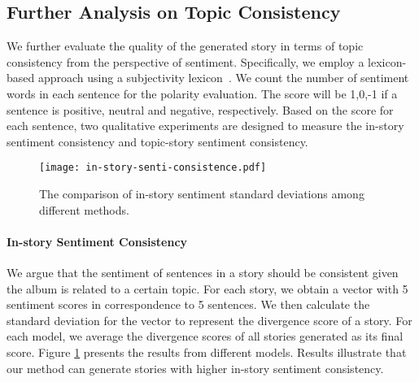 \documentclass[11pt]{article}
\newcommand{\citep}{\cite}
\begin{document}
\subsection{Further Analysis on Topic Consistency}
We further evaluate the quality of the generated story in terms of topic consistency from the perspective of sentiment. Specifically, we employ a lexicon-based approach using a subjectivity lexicon~\citep{wilson-etal-2005-recognizing}. We count the number of sentiment words in each sentence for the polarity evaluation. The score will be 1,0,-1 if a sentence is positive, neutral and negative, respectively. Based on the score for each sentence, two qualitative experiments are designed to measure the in-story sentiment consistency and topic-story sentiment consistency. 

\begin{figure}[t!]
\centering
  \texttt{[image: in-story-senti-consistence.pdf]}
  \vspace{-2mm}

  \caption{The comparison of in-story sentiment standard deviations among different methods.}
  \label{fig:in-story-sentiment}
\end{figure}


\paragraph{In-story Sentiment Consistency}
We argue that the sentiment of sentences in a story should be consistent given the album is related to a certain topic. For each story, we obtain a vector with 5 sentiment scores in correspondence to 5 sentences. We then calculate the standard deviation for the vector to represent the divergence score of a story. For each model, we average the divergence scores of all stories generated as its final score. Figure \ref{fig:in-story-sentiment} presents the results from different models. Results illustrate that our method can generate stories with higher in-story sentiment consistency.
\end{document}
